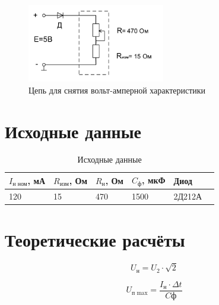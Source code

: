 \begin{figure}[H]
	\begin{center}
	\vspace{-0.5cm}
		\includegraphics[width=6cm]{img/vah}
		\caption{Цепь для снятия вольт-амперной характеристики}
		\label{figure:2.2} %
	\vspace{-0.5cm}
	\end{center}
\end{figure}

\section{Исходные данные}

\begin{table}[H]
	\begin{center}
	\caption{Исходные данные}
	\def\arraystretch{1.4}
		\begin{tabularx}{\textwidth}{|X|X|X|X|X|X|}
			\hline
			$I_\text{н ном}$, мА & $R_\text{изм}$, Ом & $R_\text{н}$, Ом & $C_\text{ф}$, мкФ & Диод\\ \hline
		    120 & 15 & 470 & 1500 & 2Д212А\\\hline	
		\end{tabularx}
		\label{tabular:11}
	\end{center}
\end{table}



\section{Теоретические расчёты}

\begin{equation}
U_\text{н} = U_2 \cdot \sqrt{2}
\end{equation}


\begin{equation}
U_\text{п max} = \frac{I_\text{н} \cdot \Delta t}{C\text{ф}}
\end{equation}

